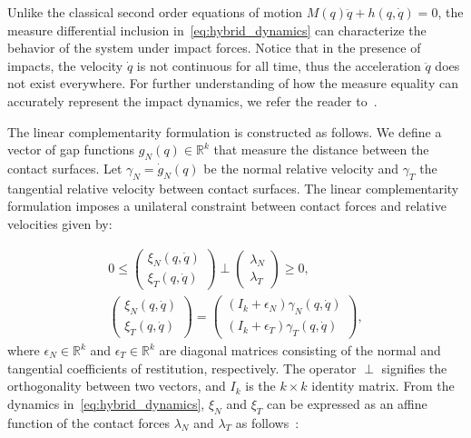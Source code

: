 \begin{rem}
  Unlike the classical second order equations of motion $M(q) \ddot{q} + h(q,
  \dot{q}) = 0$, the measure differential inclusion
  in~\eqref{eq:hybrid_dynamics} can characterize the behavior of the system
  under impact forces. Notice that in the presence of impacts, the velocity
  $\dot{q}$ is not continuous for all time, thus the acceleration $\ddot{q}$
  does not exist everywhere. For further understanding of how the measure
  equality can accurately represent the impact dynamics, we refer the reader
  to~\cite{moreau1988unilateral}.
\end{rem}
%
The linear complementarity formulation is constructed as follows. We define a
vector of gap functions $g_N(q) \in \mathbb{R}^{k}$ that measure the distance
between the contact surfaces. 
%
Let $\gamma_N = \dot{g}_N(q)$ be the normal relative velocity and
$\gamma_T$ the tangential relative velocity between contact surfaces.
%
The linear complementarity formulation imposes a unilateral constraint between
contact forces and relative velocities given by:

\begin{equation}
  \begin{gathered}
    0 \leq 
    \begin{pmatrix}
      \xi_N(q, \dot{q}) \\
      \xi_T(q, \dot{q})
    \end{pmatrix} 
    \perp
      \begin{pmatrix}
        \lambda_N  \\
        \lambda_T
      \end{pmatrix} \geq 0, \\
    \begin{pmatrix}
      \xi_N(q, \dot{q}) \\
      \xi_T(q, \dot{q})
    \end{pmatrix} =
      \begin{pmatrix}
        (I_k+\epsilon_N) \gamma_N(q, \dot{q})  \\
        (I_k+\epsilon_T) \gamma_T(q, \dot{q})
      \end{pmatrix},
  \end{gathered}
  \label{eq:complementarity} 
\end{equation}
\noindent where $\epsilon_N \in \mathbb{R}^k$ and $\epsilon_T \in \mathbb{R}^k$
are diagonal matrices consisting of the normal and tangential coefficients of
restitution, respectively. The operator $\perp$ signifies the orthogonality
between two vectors, and $I_k$ is the $k \times k$ identity matrix.
% 
From the dynamics in~\eqref{eq:hybrid_dynamics}, $\xi_N$ and $\xi_T$ can be
expressed as an affine function of the contact forces $\lambda_N$ and
$\lambda_T$ as follows~\cite{glocker2005formulation}:

